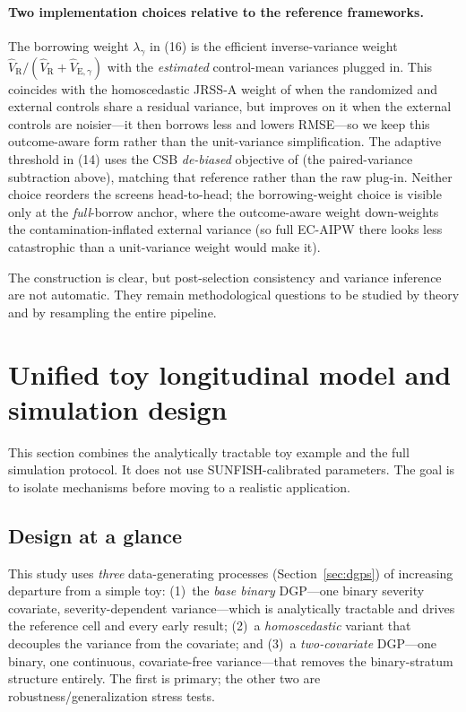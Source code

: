 \documentclass[11pt]{article}
\newcommand{\R}{\mathrm{R}}
\newcommand{\E}{\mathrm{E}}
\begin{document}
\paragraph{Two implementation choices relative to the reference frameworks.} The borrowing weight $\lambda_\gamma$ in (16) is the efficient inverse-variance weight $\widehat V_{\R}/(\widehat V_{\R}+\widehat V_{\E,\gamma})$ with the \emph{estimated} control-mean variances plugged in. This coincides with the homoscedastic JRSS-A weight of \citet{zhou2025causal} when the randomized and external controls share a residual variance, but improves on it when the external controls are noisier---it then borrows less and lowers RMSE---so we keep this outcome-aware form rather than the unit-variance simplification. The adaptive threshold in (14) uses the CSB \emph{de-biased} objective of \citet{zhu2025csb} (the paired-variance subtraction above), matching that reference rather than the raw plug-in. Neither choice reorders the screens head-to-head; the borrowing-weight choice is visible only at the \emph{full}-borrow anchor, where the outcome-aware weight down-weights the contamination-inflated external variance (so full EC-AIPW there looks less catastrophic than a unit-variance weight would make it).

The construction is clear, but post-selection consistency and variance inference are not automatic. They remain methodological questions to be studied by theory and by resampling the entire pipeline.

\section{Unified toy longitudinal model and simulation design}

This section combines the analytically tractable toy example and the full simulation protocol. It does not use SUNFISH-calibrated parameters. The goal is to isolate mechanisms before moving to a realistic application.

\subsection{Design at a glance}

This study uses \emph{three} data-generating processes (Section~\ref{sec:dgps}) of increasing departure from a simple toy: (1)~the \emph{base binary} DGP---one binary severity covariate, severity-dependent variance---which is analytically tractable and drives the reference cell and every early result; (2)~a \emph{homoscedastic} variant that decouples the variance from the covariate; and (3)~a \emph{two-covariate} DGP---one binary, one continuous, covariate-free variance---that removes the binary-stratum structure entirely. The first is primary; the other two are robustness/generalization stress tests.
\end{document}
